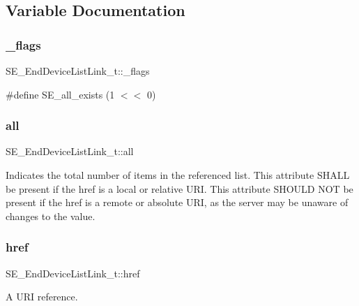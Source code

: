 \subsection{Variable Documentation}
\mbox{\label{group__EndDeviceListLink_ga875ed914707e5607614df916298bef65}} 
\subsubsection{\texorpdfstring{\+\_\+flags}{\_flags}}
{\footnotesize\ttfamily S\+E\+\_\+\+End\+Device\+List\+Link\+\_\+t\+::\+\_\+flags}

\#define S\+E\+\_\+all\+\_\+exists (1 $<$$<$ 0) \mbox{\label{group__EndDeviceListLink_gae6814db0fb5e290316ad9b78953de83a}} 
\subsubsection{\texorpdfstring{all}{all}}
{\footnotesize\ttfamily S\+E\+\_\+\+End\+Device\+List\+Link\+\_\+t\+::all}

Indicates the total number of items in the referenced list. This attribute S\+H\+A\+LL be present if the href is a local or relative U\+RI. This attribute S\+H\+O\+U\+LD N\+OT be present if the href is a remote or absolute U\+RI, as the server may be unaware of changes to the value. \mbox{\label{group__EndDeviceListLink_ga240c0bf38b6059ce62221922aee9b08f}} 
\subsubsection{\texorpdfstring{href}{href}}
{\footnotesize\ttfamily S\+E\+\_\+\+End\+Device\+List\+Link\+\_\+t\+::href}

A U\+RI reference. 